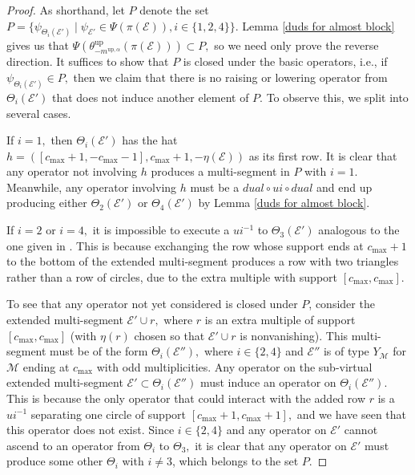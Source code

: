 \documentclass[11pt,letterpaper]{amsart}
\newcommand{\up}{{\mathrm{up}}}
\newcommand{\EE}{\mathcal{E}}
\numberwithin{equation}{section}
\begin{document}
\begin{proof}
    As shorthand, let $P$ denote the set $P = \{\psi_{\Theta_i(\EE')} \mid  \psi_{\EE'} \in \Psi(\pi(\mathcal{E})), i \in \{1, 2, 4\}\}.$ Lemma \ref{duds for almost block} gives us that $\Psi(\theta_{-m^{\up, \alpha}}^\up(\pi(\mathcal{E}))) \subset P,$ so we need only prove the reverse direction. It suffices to show that $P$ is closed under the basic operators, i.e., if $\psi_{\Theta_i(\mathcal{E}')} \in P,$ then we claim that there is no raising or lowering operator from $\Theta_i(\mathcal{E}')$ that does not induce another element of $P.$ To observe this, we split into several cases.

    If $i = 1,$ then $\Theta_i(\mathcal{E}')$ has the hat $h = ([c_{\max} + 1, -c_{\max} - 1], c_{\max} + 1, -\eta(\mathcal{E}))$ as its first row. It is clear that any operator not involving $h$ produces a multi-segment in $P$ with $i = 1.$ Meanwhile, any operator involving $h$ must be a $dual \circ ui \circ dual$ and end up producing either $\Theta_2(\mathcal{E}')$ or $\Theta_4(\mathcal{E}')$ by Lemma \ref{duds for almost block}.
    
    If $i = 2$ or $i = 4,$ it is impossible to execute a $ui^{-1}$ to $\Theta_3(\mathcal{E}')$ analogous to the one given in \cite[Theorem 6.5]{HKT26}. This is because exchanging the row whose support ends at $c_{\max} + 1$ to the bottom of the extended multi-segment produces a row with two triangles rather than a row of circles, due to the extra multiple with support $[c_{\max}, c_{\max}]$.
    
    To see that any operator not yet considered is closed under $P$, consider the extended multi-segment $\mathcal{E}' \cup r,$ where $r$ is an extra multiple of support $[c_{\max}, c_{\max}]$ (with $\eta(r)$ chosen so that $\mathcal{E}' \cup r$ is nonvanishing). This multi-segment must be of the form $\Theta_i(\mathcal{E}''),$ where $i \in \{2, 4\}$ and $\mathcal{E}''$ is of type $Y_{\mathcal{M}}$ for $\mathcal{M}$ ending at $c_{\max}$ with odd multiplicities. Any operator on the sub-virtual extended multi-segment $\mathcal{E}' \subset \Theta_i(\mathcal{E}'')$ must induce an operator on $\Theta_i(\mathcal{E}'').$ This is because the only operator that could interact with the added row $r$ is a $ui^{-1}$ separating one circle of support $[c_{\max} + 1, c_{\max} + 1],$ and we have seen that this operator does not exist. Since $i \in \{2, 4\}$ and any operator on $\mathcal{E}'$ cannot ascend to an operator from $\Theta_i$ to $\Theta_3,$ it is clear that any operator on $\mathcal{E}'$ must produce some other $\Theta_i$ with $i \neq 3$, which belongs to the set $P.$
\end{proof}
\end{document}
